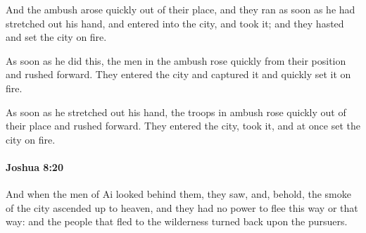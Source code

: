 			\begin{versebox}
					\item[BHS] 
					\item[ASV] And the ambush arose quickly out of their place, and they ran as soon as he had stretched out his hand, and entered into the city, and took it; and they hasted and set the city on fire.
					\item[NIV] As soon as he did this, the men in the ambush rose quickly from their position and rushed forward. They entered the city and captured it and quickly set it on fire.
					\item[NRSV] As soon as he stretched out his hand, the troops in ambush rose quickly out of their place and rushed forward. They entered the city, took it, and at once set the city on fire.
			\end{versebox}

		\paragraph{Joshua 8:20} %
			\label{JOSHUA-8-20}

			And when the men of Ai looked behind them, they saw, and, behold, the smoke of the city ascended up to heaven, and they had no power to flee this way or that way: and the people that fled to the wilderness turned back upon the pursuers.

